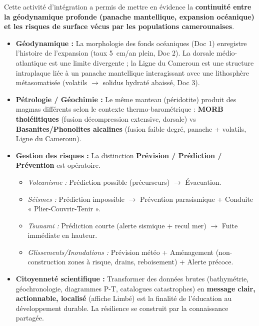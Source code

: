 \documentclass[11pt]{article}
\newcounter{popsec}
\newcounter{popsub}
\newcommand{\courssub}[1]{%
  \stepcounter{popsub}%
  \par\vspace{9pt}\noindent{\popxbold\fontsize{11.5}{13}\selectfont\color{popink}{\color{poporange}\thepopsec.\thepopsub}\hspace{6pt}#1}\par\nopagebreak\vspace{4pt}
}
\begin{document}
\courssub{Bilan de l'activité}
\par
Cette activité d'intégration a permis de mettre en évidence la \textbf{continuité entre la géodynamique profonde (panache mantellique, expansion océanique) et les risques de surface vécus par les populations camerounaises}.
\begin{aretenir}
\begin{itemize}
    \item \textbf{Géodynamique :} La morphologie des fonds océaniques (Doc 1) enregistre l'histoire de l'expansion (taux \SI{5}{cm/an} plein, Doc 2). La dorsale médio-atlantique est une limite divergente ; la Ligne du Cameroun est une structure intraplaque liée à un panache mantellique interagissant avec une lithosphère métasomatisée (volatils $\rightarrow$ solidus hydraté abaissé, Doc 3).
    \item \textbf{Pétrologie / Géochimie :} Le même manteau (péridotite) produit des magmas différents selon le contexte thermo-barométrique : \textbf{MORB tholéiitiques} (fusion décompression extensive, dorsale) vs \textbf{Basanites/Phonolites alcalines} (fusion faible degré, panache + volatils, Ligne du Cameroun).
    \item \textbf{Gestion des risques :} La distinction \textbf{Prévision / Prédiction / Prévention} est opératoire.
    \begin{itemize}
        \item \emph{Volcanisme :} Prédiction possible (précurseurs) $\rightarrow$ Évacuation.
        \item \emph{Séismes :} Prédiction impossible $\rightarrow$ Prévention parasismique + Conduite « Plier-Couvrir-Tenir ».
        \item \emph{Tsunami :} Prédiction courte (alerte sismique + recul mer) $\rightarrow$ Fuite immédiate en hauteur.
        \item \emph{Glissements/Inondations :} Prévision météo + Aménagement (non-construction zones à risque, drains, reboisement) + Alerte précoce.
    \end{itemize}
    \item \textbf{Citoyenneté scientifique :} Transformer des données brutes (bathymétrie, géochronologie, diagrammes P-T, catalogues catastrophes) en \textbf{message clair, actionnable, localisé} (affiche Limbé) est la finalité de l'éducation au développement durable. La résilience se construit par la connaissance partagée.
\end{itemize}
\end{aretenir}
\end{document}
